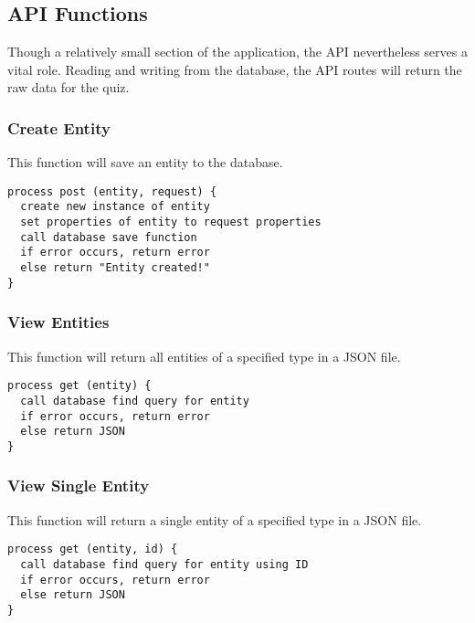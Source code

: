 \subsection{API Functions}
Though a relatively small section of the application, the API nevertheless serves a vital role. Reading and writing from the database, the API routes will return the raw data for the quiz.

\subsubsection{Create Entity}
This function will save an entity to the database.
\begin{verbatim}
process post (entity, request) {
  create new instance of entity
  set properties of entity to request properties
  call database save function
  if error occurs, return error
  else return "Entity created!"
}
\end{verbatim}

\subsubsection{View Entities}
This function will return all entities of a specified type in a JSON file.
\begin{verbatim}
process get (entity) {
  call database find query for entity
  if error occurs, return error
  else return JSON
}
\end{verbatim}

\subsubsection{View Single Entity}
This function will return a single entity of a specified type in a JSON file.
\begin{verbatim}
process get (entity, id) {
  call database find query for entity using ID
  if error occurs, return error
  else return JSON
}
\end{verbatim}
